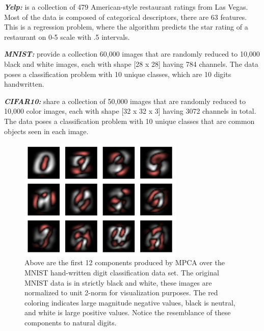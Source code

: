 \documentclass{scspaperproc}
\theoremstyle{scsthe}
\begin{document}
\textbf{\textit{Yelp:}}  is a collection of 479 American-style
restaurant ratings from Las Vegas. Most of the data is composed of
categorical descriptors, there are 63 features. This is a regression
problem, where the algorithm predicts the star rating of a restaurant
on 0-5 scale with .5 intervals.

\textbf{\textit{MNIST:}}  provide a collection 60,000
images that are randomly reduced to 10,000 black and white images,
each with shape [28 x 28] having 784 channels. The data poses a
classification problem with 10 unique classes, which are 10 digits
handwritten.

\textbf{\textit{CIFAR10:}}  share a
collection of 50,000 images that are randomly reduced to 10,000 color
images, each with shape [32 x 32 x 3] having 3072 channels in
total. The data poses a classification problem with 10 unique classes
that are common objects seen in each image.

\begin{figure}
  \centering
  \includegraphics[width=0.7\textwidth]{2-mpca-MNIST-components.png}
  \caption{Above are the first 12 components produced by MPCA over the
    MNIST hand-written digit classification data set. The original
    MNIST data is in strictly black and white, these images are
    normalized to unit 2-norm for visualization purposes. The red
    coloring indicates large magnitude negative values, black is
    neutral, and white is large positive values. Notice the
    resemblance of these components to natural digits.}
  \label{fig:mnist}
\end{figure}
\end{document}
